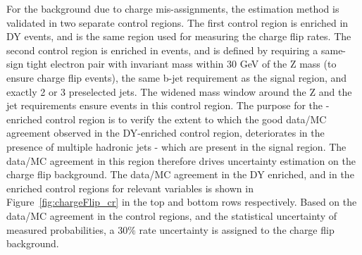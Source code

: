 For the background due to charge mis-assignments, the estimation method is validated in two separate control regions.
The first control region is enriched in DY events, and is the same region used for measuring the charge flip rates.
The second control region is enriched in \ttbar events, and is defined by requiring a same-sign tight electron pair with invariant
mass within 30 GeV of the Z mass (to ensure charge flip events), the same b-jet requirement as the signal region,
and exactly 2 or 3 preselected jets. The widened mass window around the Z and the jet requirements ensure \ttbar events in this
control region. The purpose for the \ttbar-enriched control region is to verify the extent to which the good data/MC agreement observed
in the DY-enriched control region, deteriorates in the presence of multiple hadronic jets - which are present in the signal region. 
The data/MC agreement in this region therefore drives uncertainty estimation on the charge flip background. 
The data/MC agreement in the DY enriched, and in the \ttbar enriched control regions
for relevant variables is shown in Figure~\ref{fig:chargeFlip_cr} in the top and bottom rows respectively.
Based on the data/MC agreement in the control regions, and the statistical uncertainty of measured probabilities,
a 30$\%$ rate uncertainty is assigned to the charge flip background.


